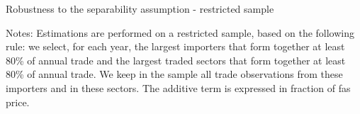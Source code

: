 \documentclass[a4paper,11pt]{article}
\begin{document}

\begin{table}[htbp]
	\centering
	\caption{Robustness to the separability assumption - restricted sample}
	\begin{center}
			
%			
	\end{center}
	\parbox[l]{12cm}{\footnotesize{Notes: Estimations are performed on a restricted sample, based on the following rule:  we select, for each year, the largest importers that form together at least 80\% of annual trade and the largest traded sectors that form together at least 80\% of annual trade. We keep in the sample all trade observations from these importers and in these sectors.
			The additive term is expressed in fraction of fas price.}}
	\label{tab:robustness_separability}
\end{table}
\end{document}
